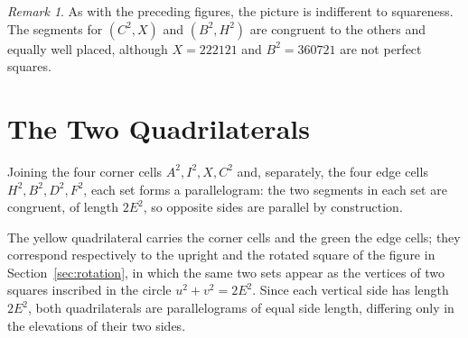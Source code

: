 \documentclass[12pt]{article}
\theoremstyle{remark}
\newtheorem{remark}[theorem]{Remark}
\begin{document}
\begin{remark}
As with the preceding figures, the picture is indifferent to
squareness. The segments for $(C^2, X)$ and $(B^2, H^2)$ are congruent
to the others and equally well placed, although $X = 222121$ and
$B^2 = 360721$ are not perfect squares.
\end{remark}

\section{The Two Quadrilaterals}

Joining the four corner cells $A^2, I^2, X, C^2$ and, separately, the
four edge cells $H^2, B^2, D^2, F^2$, each set forms a parallelogram:
the two segments in each set are congruent, of length $2E^2$, so
opposite sides are parallel by construction.

\begin{center}
\end{center}

The yellow quadrilateral carries the corner cells and the green the
edge cells; they correspond respectively to the upright and the rotated
square of the figure in Section~\ref{sec:rotation}, in which the same
two sets appear as the vertices of two squares inscribed in the circle
$u^2 + v^2 = 2E^2$. Since each vertical side has length $2E^2$, both
quadrilaterals are parallelograms of equal side length, differing only
in the elevations of their two sides.
\end{document}
